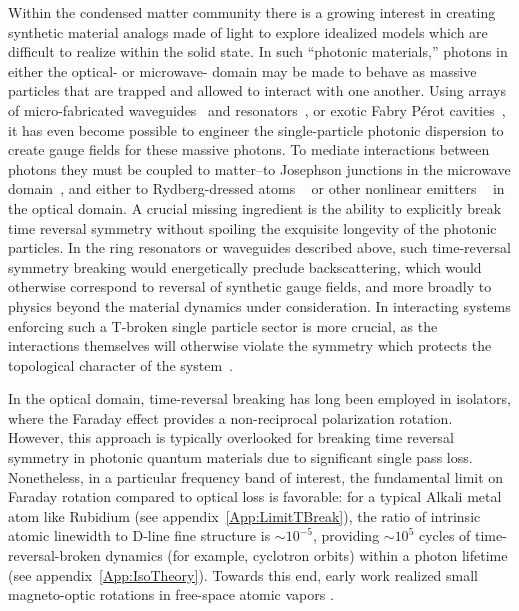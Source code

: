 \documentclass[aps,pra,twocolumn,groupedaddress,10pt,showpacs]{revtex4-1}
\begin{document}
Within the condensed matter community there is a growing interest in creating synthetic material analogs made of light to explore idealized models which are difficult to realize within the solid state. In such ``photonic materials,'' photons in either the optical- or microwave- domain may be made to behave as massive particles that are trapped and allowed to interact with one another. Using arrays of micro-fabricated waveguides~\cite{rech2013phot} and resonators~\cite{hafe2013imag,ning2015time}, or exotic Fabry P\'erot cavities~\cite{schine2016synthetic, klae2010bose, sommer2016engineering}, it has even become possible to engineer the single-particle photonic dispersion to create gauge fields for these massive photons. To mediate interactions between photons they must be coupled to matter--to Josephson junctions in the microwave domain~\cite{wallraff2004strong,houck2012chip}, and either to Rydberg-dressed atoms ~\cite{peyr2012quan, dudi2012stro, pari2012obse, firs2013attr, Jia2016CavityRydPol, jia2017strongly} or other nonlinear emitters ~\cite{sun2016quantum} in the optical domain. A crucial missing ingredient is the ability to explicitly break time reversal symmetry without spoiling the exquisite longevity of the photonic particles. In the ring resonators or waveguides described above, such time-reversal symmetry breaking would energetically preclude backscattering, which would otherwise correspond to reversal of synthetic gauge fields, and more broadly to physics beyond the material dynamics under consideration. In interacting systems enforcing such a T-broken single particle sector is more crucial, as the interactions themselves will otherwise violate the symmetry which protects the topological character of the system~\cite{fialko2014fragility,lodahl2016chiral}.

In the optical domain, time-reversal breaking has long been employed in isolators, where the Faraday effect provides a non-reciprocal polarization rotation. However, this approach is typically overlooked for breaking time reversal symmetry in photonic quantum materials due to significant single pass loss. Nonetheless, in a particular frequency band of interest, the fundamental limit on Faraday rotation compared to optical loss is favorable: for a typical Alkali metal atom like Rubidium (see appendix~\ref{App:LimitTBreak}), the ratio of intrinsic atomic linewidth to D-line fine structure is $\sim10^{-5}$, providing $\sim 10^5$ cycles of time-reversal-broken dynamics (for example, cyclotron orbits) within a photon lifetime (see appendix~\ref{App:IsoTheory}). Towards this end, early work realized small magneto-optic rotations in free-space atomic vapors \cite{franke2001magneto}.
\end{document}
